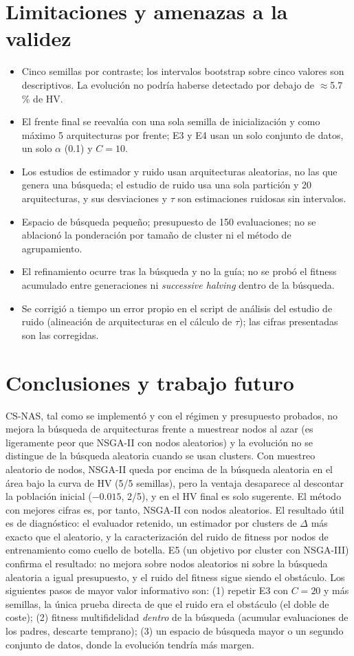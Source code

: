 \documentclass[11pt,a4paper]{article}
\begin{document}
\section{Limitaciones y amenazas a la validez}
\begin{itemize}[leftmargin=*,itemsep=1pt]
\item Cinco semillas por contraste; los intervalos bootstrap sobre cinco valores son descriptivos. La evolución no podría haberse detectado por debajo de $\approx$5.7\,\% de HV.
\item El frente final se reevalúa con una sola semilla de inicialización y como máximo 5 arquitecturas por frente; E3 y E4 usan un solo conjunto de datos, un solo $\alpha$ (0.1) y $C=10$.
\item Los estudios de estimador y ruido usan arquitecturas aleatorias, no las que genera una búsqueda; el estudio de ruido usa una sola partición y 20 arquitecturas, y sus desviaciones y $\tau$ son estimaciones ruidosas sin intervalos.
\item Espacio de búsqueda pequeño; presupuesto de 150 evaluaciones; no se ablacionó la ponderación por tamaño de cluster ni el método de agrupamiento.
\item El refinamiento ocurre tras la búsqueda y no la guía; no se probó el fitness acumulado entre generaciones ni \emph{successive halving} dentro de la búsqueda.
\item Se corrigió a tiempo un error propio en el script de análisis del estudio de ruido (alineación de arquitecturas en el cálculo de $\tau$); las cifras presentadas son las corregidas.
\end{itemize}

\section{Conclusiones y trabajo futuro}
CS-NAS, tal como se implementó y con el régimen y presupuesto probados, no mejora la búsqueda de arquitecturas frente a muestrear nodos al azar (es ligeramente peor que NSGA-II con nodos aleatorios) y la evolución no se distingue de la búsqueda aleatoria cuando se usan clusters. Con muestreo aleatorio de nodos, NSGA-II queda por encima de la búsqueda aleatoria en el área bajo la curva de HV (5/5 semillas), pero la ventaja desaparece al descontar la población inicial ($-0.015$, 2/5), y en el HV final es solo sugerente. El método con mejores cifras es, por tanto, NSGA-II con nodos aleatorios. El resultado útil es de diagnóstico: el evaluador retenido, un estimador por clusters de $\Delta$ más exacto que el aleatorio, y la caracterización del ruido de fitness por nodos de entrenamiento como cuello de botella. E5 (un objetivo por cluster con NSGA-III) confirma el resultado: no mejora sobre nodos aleatorios ni sobre la búsqueda aleatoria a igual presupuesto, y el ruido del fitness sigue siendo el obstáculo. Los siguientes pasos de mayor valor informativo son: (1) repetir E3 con $C=20$ y más semillas, la única prueba directa de que el ruido era el obstáculo (el doble de coste); (2) fitness multifidelidad \emph{dentro} de la búsqueda (acumular evaluaciones de los padres, descarte temprano); (3) un espacio de búsqueda mayor o un segundo conjunto de datos, donde la evolución tendría más margen.
\end{document}

